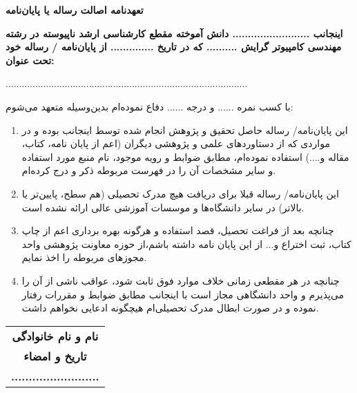 \thispagestyle{empty}
\noindent

\begin{center}
	\textbf{\Large تعهدنامه اصالت رساله یا پایان‌نامه}
\end{center}
\vskip 0.5cm

{\bfseries
	اینجانب ......................... دانش آموخته مقطع کارشناسی ارشد ناپیوسته در رشته مهندسی کامپیوتر گرایش .......... که در تاریخ .............. از پایان‌نامه / رساله خود تحت عنوان:
	
	
	\begin{center}
		..........................................................................................
	\end{center}
	
	
	با کسب نمره ...... و درجه ...... دفاع نموده‌ام بدین‌وسیله متعهد می‌شوم:
}
\begin{enumerate}
	\item این پایان‌نامه/ رساله حاصل تحقیق و پژوهش انجام شده توسط اینجانب بوده و در مواردی که از دستاوردهای علمی و پژوهشی دیگران (اعم از پایان نامه، کتاب، مقاله و....) استفاده نموده‌ام، مطابق ضوابط و رویه موجود، نام منبع مورد استفاده و سایر مشخصات آن را در فهرست مربوطه ذکر و درج کرده‌ام.
	\item این پایان‌نامه/ رساله قبلا برای دریافت هیچ مدرک تحصیلی (هم سطح، پایین‌تر یا بالاتر) در سایر دانشگاه‌ها و موسسات آموزشی عالی ارائه نشده است.
	\item 	چنانچه بعد از فراغت تحصیل، قصد استفاده و هرگونه بهره برداری اعم از چاپ کتاب، ثبت اختراع و... از این پایان نامه داشته باشم،از حوزه معاونت پژوهشی واحد مجوزهای مربوطه را اخذ نمایم.
	\item 	چنانچه در هر مقطعی زمانی خلاف موارد فوق ثابت شود، عواقب ناشی از آن را می‌پذیرم و واحد دانشگاهی مجاز است با اینجانب مطابق ضوابط و مقررات رفتار نموده و در صورت ابطال مدرک تحصیلی‌ام هیچگونه ادعایی نخواهم داشت.
\end{enumerate}

\vskip 0.5cm
\begin{flushleft}
	{\large
		\begin{tabular}{@{}c@{}}
			\textbf{نام و نام خانوادگی}\\
			\textbf{تاریخ و امضاء} \\
			\vspace*{-2mm}
			\textbf{.........................}
		\end{tabular}
	}
\end{flushleft}